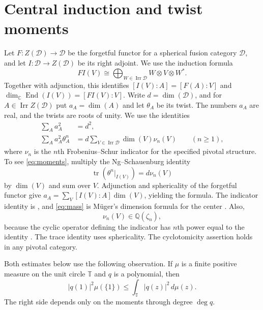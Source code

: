 \documentclass[11pt,a4paper]{article}
\theoremstyle{definition}
\theoremstyle{remark}
\newcommand{\C}{\mathbb C}
\newcommand{\Q}{\mathbb Q}
\newcommand{\T}{\mathbb T}
\newcommand{\cD}{\mathcal D}
\newcommand{\Irr}{\operatorname{Irr}}
\newcommand{\tr}{\operatorname{tr}}
\numberwithin{equation}{section}
\begin{document}
\section{Central induction and twist moments}\label{sec:central}


Let $F:Z(\cD)\to\cD$ be the forgetful functor for a spherical
fusion category $\cD$, and let $I:\cD\to Z(\cD)$ be its right adjoint. We use the induction formula \cite[Proposition~2.4]{Ostrik}
\begin{equation}\label{eq:FI}
 FI(V)\cong\bigoplus_{W\in\Irr\cD}W\otimes V\otimes W^*.
\end{equation}
Together with adjunction, this identifies
$[I(V):A]=[F(A):V]$ and
$\dim_{\C}\operatorname{End}(I(V))=[FI(V):V]$.
Write $d=\dim(\cD)$, and for $A\in\Irr Z(\cD)$ put $a_A=\dim(A)$ and let $\theta_A$ be its twist. The numbers $a_A$ are real, and the twists are roots of unity. We use the identities
\begin{align}
 \sum_A a_A^2&=d^2,\label{eq:mass}\\
 \sum_A a_A^2\theta_A^n
   &=d\sum_{V\in\Irr\cD}\dim(V)\nu_n(V)\qquad(n\geq1),\label{eq:moments}
\end{align}
where $\nu_n$ is the $n$th Frobenius--Schur indicator for the specified pivotal structure. To see \eqref{eq:moments}, multiply the Ng--Schauenburg identity
\[
 \tr(\theta^n|_{I(V)})=d\nu_n(V)
\]
by $\dim(V)$ and sum over $V$. Adjunction and sphericality of the forgetful functor give
$a_A=\sum_V[I(V):A]\dim(V)$, yielding the formula. The indicator identity is \cite[Theorem~4.1]{NSexp}, and \eqref{eq:mass} is Müger's dimension formula for the center \cite{Muger}. Also,
\begin{equation}\label{eq:cyclo}
 \nu_n(V)\in\Q(\zeta_n),
\end{equation}
because the cyclic operator defining the indicator has $n$th power equal to the identity \cite[Theorem~5.1]{NSind}. The trace identity uses sphericality. The cyclotomicity assertion holds in any pivotal category.

Both estimates below use the following observation. If $\mu$ is a
finite positive measure on the unit circle $\T$ and $q$ is a polynomial,
then
\begin{equation}\label{eq:atom}
  |q(1)|^2\mu(\{1\})\leq\int_{\T}|q(z)|^2\,d\mu(z).
\end{equation}
The right side depends only on the moments through degree $\deg q$.
\end{document}
